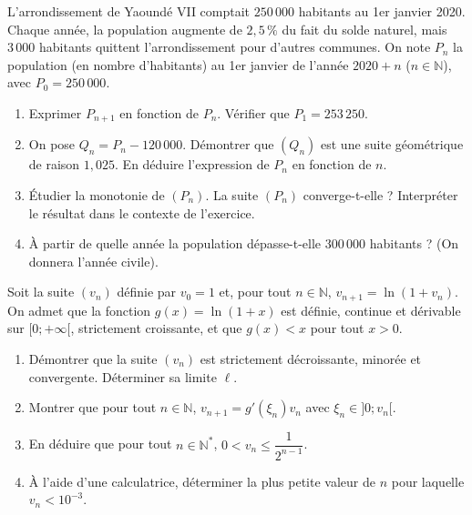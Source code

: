 \documentclass[11pt]{article}
\begin{document}
\begin{exercice}
L'arrondissement de Yaoundé VII comptait $250\,000$ habitants au 1er janvier 2020. Chaque année, la population augmente de $2,5\,\%$ du fait du solde naturel, mais $3\,000$ habitants quittent l'arrondissement pour d'autres communes.
On note $P_n$ la population (en nombre d'habitants) au 1er janvier de l'année $2020 + n$ ($n \in \mathbb{N}$), avec $P_0 = 250\,000$.
\begin{enumerate}
    \item Exprimer $P_{n+1}$ en fonction de $P_n$. Vérifier que $P_1 = 253\,250$.
    \item On pose $Q_n = P_n - 120\,000$. Démontrer que $(Q_n)$ est une suite géométrique de raison $1,025$. En déduire l'expression de $P_n$ en fonction de $n$.
    \item Étudier la monotonie de $(P_n)$. La suite $(P_n)$ converge-t-elle ? Interpréter le résultat dans le contexte de l'exercice.
    \item À partir de quelle année la population dépasse-t-elle $300\,000$ habitants ? (On donnera l'année civile).
\end{enumerate}
\end{exercice}

\begin{exercice}
Soit la suite $(v_n)$ définie par $v_0 = 1$ et, pour tout $n \in \mathbb{N}$, $v_{n+1} = \ln(1 + v_n)$.
On admet que la fonction $g(x) = \ln(1+x)$ est définie, continue et dérivable sur $[0; +\infty[$, strictement croissante, et que $g(x) < x$ pour tout $x > 0$.
\begin{enumerate}
    \item Démontrer que la suite $(v_n)$ est strictement décroissante, minorée et convergente. Déterminer sa limite $\ell$.
    \item Montrer que pour tout $n \in \mathbb{N}$, $v_{n+1} = g'(\xi_n) v_n$ avec $\xi_n \in ]0; v_n[$.
    \item En déduire que pour tout $n \in \mathbb{N}^*$, $0 < v_n \leqslant \dfrac{1}{2^{n-1}}$.
    \item À l'aide d'une calculatrice, déterminer la plus petite valeur de $n$ pour laquelle $v_n < 10^{-3}$.
\end{enumerate}
\end{exercice}
\end{document}
